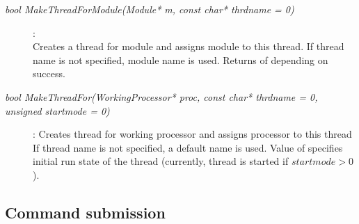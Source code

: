 \begin{description}

\item[\em bool MakeThreadForModule\small (Module* m, const char* thrdname = 0) ] :
 \\
Creates a thread for module  and assigns module to this thread.
If thread name  is not specified, module name is used.
Returns  of  
 depending on success.
	   

\item[\em bool MakeThreadFor\small (WorkingProcessor* proc, const char* thrdname = 0, unsigned startmode = 0) ] :
Creates thread for working processor  and assigns processor to this thread
If thread name  is not specified, a default name is used.
Value of  specifies initial run state of the thread
(currently, thread is started if $startmode>0$).


        

	   
\end{description}
	 
\subsection{Command submission}	 
	
